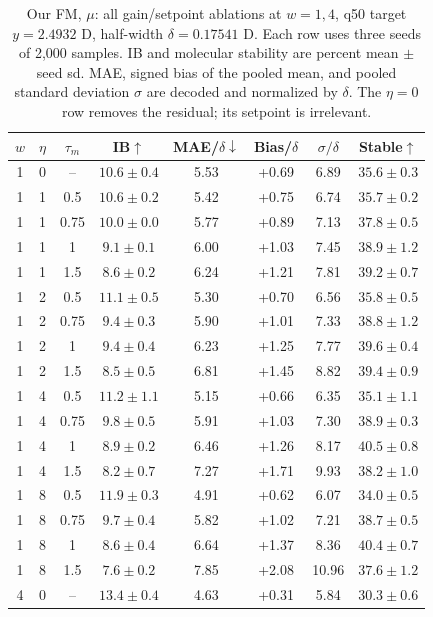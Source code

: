 \documentclass{article}
\begin{document}
\begin{table}[!htbp]
\centering\small
\caption{Our FM, $\mu$: all gain/setpoint ablations at $w=1,4$, q50 target $y=2.4932$ D, half-width $\delta=0.17541$ D. Each row uses three seeds of 2,000 samples. IB and molecular stability are percent mean $\pm$ seed sd. MAE, signed bias of the pooled mean, and pooled standard deviation $\sigma$ are decoded and normalized by $\delta$. The $\eta=0$ row removes the residual; its setpoint is irrelevant.}
\label{tab:grid-fm-mu}
\begin{tabular}{cccccccc}
\toprule
$w$ & $\eta$ & $\tau_m$ & IB$\uparrow$ & MAE/$\delta\downarrow$ & Bias/$\delta$ & $\sigma/\delta$ & Stable$\uparrow$\\
\midrule
1 & 0 & -- & $10.6\pm0.4$ & 5.53 & +0.69 & 6.89 & $35.6\pm0.3$\\
1 & 1 & 0.5 & $10.6\pm0.2$ & 5.42 & +0.75 & 6.74 & $35.7\pm0.2$\\
1 & 1 & 0.75 & $10.0\pm0.0$ & 5.77 & +0.89 & 7.13 & $37.8\pm0.5$\\
1 & 1 & 1 & $9.1\pm0.1$ & 6.00 & +1.03 & 7.45 & $38.9\pm1.2$\\
1 & 1 & 1.5 & $8.6\pm0.2$ & 6.24 & +1.21 & 7.81 & $39.2\pm0.7$\\
1 & 2 & 0.5 & $11.1\pm0.5$ & 5.30 & +0.70 & 6.56 & $35.8\pm0.5$\\
1 & 2 & 0.75 & $9.4\pm0.3$ & 5.90 & +1.01 & 7.33 & $38.8\pm1.2$\\
1 & 2 & 1 & $9.4\pm0.4$ & 6.23 & +1.25 & 7.77 & $39.6\pm0.4$\\
1 & 2 & 1.5 & $8.5\pm0.5$ & 6.81 & +1.45 & 8.82 & $39.4\pm0.9$\\
1 & 4 & 0.5 & $11.2\pm1.1$ & 5.15 & +0.66 & 6.35 & $35.1\pm1.1$\\
1 & 4 & 0.75 & $9.8\pm0.5$ & 5.91 & +1.03 & 7.30 & $38.9\pm0.3$\\
1 & 4 & 1 & $8.9\pm0.2$ & 6.46 & +1.26 & 8.17 & $40.5\pm0.8$\\
1 & 4 & 1.5 & $8.2\pm0.7$ & 7.27 & +1.71 & 9.93 & $38.2\pm1.0$\\
1 & 8 & 0.5 & $11.9\pm0.3$ & 4.91 & +0.62 & 6.07 & $34.0\pm0.5$\\
1 & 8 & 0.75 & $9.7\pm0.4$ & 5.82 & +1.02 & 7.21 & $38.7\pm0.5$\\
1 & 8 & 1 & $8.6\pm0.4$ & 6.64 & +1.37 & 8.36 & $40.4\pm0.7$\\
1 & 8 & 1.5 & $7.6\pm0.2$ & 7.85 & +2.08 & 10.96 & $37.6\pm1.2$\\
\midrule
4 & 0 & -- & $13.4\pm0.4$ & 4.63 & +0.31 & 5.84 & $30.3\pm0.6$\\

\end{tabular}
\end{table}
\end{document}
